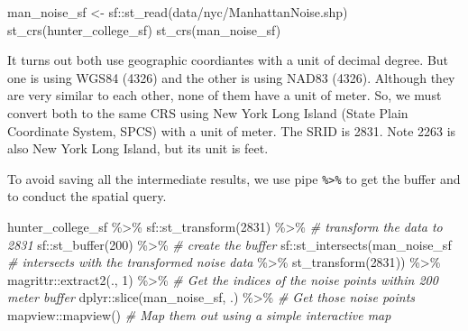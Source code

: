 \documentclass[
  11pt,
]{book}
\newenvironment{Shaded}{\begin{snugshade}}{\end{snugshade}}
\newcommand{\CommentTok}[1]{\textcolor[rgb]{0.56,0.35,0.01}{\textit{#1}}}
\newcommand{\DecValTok}[1]{\textcolor[rgb]{0.00,0.00,0.81}{#1}}
\newcommand{\FunctionTok}[1]{\textcolor[rgb]{0.00,0.00,0.00}{#1}}
\newcommand{\NormalTok}[1]{#1}
\newcommand{\OtherTok}[1]{\textcolor[rgb]{0.56,0.35,0.01}{#1}}
\newcommand{\SpecialCharTok}[1]{\textcolor[rgb]{0.00,0.00,0.00}{#1}}
\newcommand{\StringTok}[1]{\textcolor[rgb]{0.31,0.60,0.02}{#1}}
\begin{document}
\begin{Shaded}
\begin{Highlighting}[]
\NormalTok{man\_noise\_sf }\OtherTok{\textless{}{-}}\NormalTok{ sf}\SpecialCharTok{::}\FunctionTok{st\_read}\NormalTok{(}\StringTok{\textquotesingle{}data/nyc/ManhattanNoise.shp\textquotesingle{}}\NormalTok{)}
\FunctionTok{st\_crs}\NormalTok{(hunter\_college\_sf)}
\FunctionTok{st\_crs}\NormalTok{(man\_noise\_sf)}
\end{Highlighting}
\end{Shaded}

It turns out both use geographic coordiantes with a unit of decimal degree. But one is using WGS84 (4326) and the other is using NAD83 (4326). Although they are very similar to each other, none of them have a unit of meter. So, we must convert both to the same CRS using New York Long Island (State Plain Coordinate System, SPCS) with a unit of meter. The SRID is 2831. Note 2263 is also New York Long Island, but its unit is feet.

To avoid saving all the intermediate results, we use pipe \texttt{\%\textgreater{}\%} to get the buffer and to conduct the spatial query.

\begin{Shaded}
\begin{Highlighting}[]
\NormalTok{  hunter\_college\_sf }\SpecialCharTok{\%\textgreater{}\%}\NormalTok{ sf}\SpecialCharTok{::}\FunctionTok{st\_transform}\NormalTok{(}\DecValTok{2831}\NormalTok{) }\SpecialCharTok{\%\textgreater{}\%} \CommentTok{\# transform the data to 2831}
\NormalTok{    sf}\SpecialCharTok{::}\FunctionTok{st\_buffer}\NormalTok{(}\DecValTok{200}\NormalTok{) }\SpecialCharTok{\%\textgreater{}\%} \CommentTok{\# create the buffer}
\NormalTok{    sf}\SpecialCharTok{::}\FunctionTok{st\_intersects}\NormalTok{(man\_noise\_sf }\CommentTok{\# intersects with the transformed noise data}
                        \SpecialCharTok{\%\textgreater{}\%} \FunctionTok{st\_transform}\NormalTok{(}\DecValTok{2831}\NormalTok{)) }\SpecialCharTok{\%\textgreater{}\%} 
\NormalTok{    magrittr}\SpecialCharTok{::}\FunctionTok{extract2}\NormalTok{(., }\DecValTok{1}\NormalTok{) }\SpecialCharTok{\%\textgreater{}\%} \CommentTok{\# Get the indices of the noise points within 200 meter buffer}
\NormalTok{    dplyr}\SpecialCharTok{::}\FunctionTok{slice}\NormalTok{(man\_noise\_sf, .) }\SpecialCharTok{\%\textgreater{}\%} \CommentTok{\# Get those noise points}
\NormalTok{    mapview}\SpecialCharTok{::}\FunctionTok{mapview}\NormalTok{() }\CommentTok{\# Map them out using a simple interactive map}
\end{Highlighting}
\end{Shaded}
\end{document}
